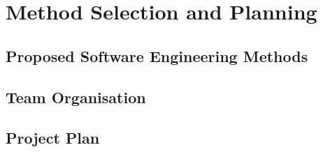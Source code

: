 \chapter{Method Selection and Planning}
\section{Proposed Software Engineering Methods}
\section{Team Organisation}
\section{Project Plan}